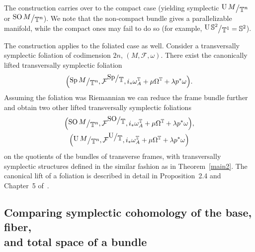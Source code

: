 \documentclass[pdftex]{sigma}
\numberwithin{equation}{section}
\newcommand{\bigslant}[2]{{\raisebox{.2em}{$#1$}\big/\raisebox{-.2em}{$#2$}}}
\begin{document}
\begin{Remark}\label{main3}
The construction carries over to the compact case (yielding symplectic $\bigslant{\operatorname{U} M}{\mathbb{T}^n}$ or $\bigslant{\operatorname{SO} M}{\mathbb{T}^n}$). We note that the non-compact bundle gives a parallelizable manifold, while the compact ones may fail to do so (for example, $\bigslant{\operatorname{U} \mathbb{S}^2}{\mathbb{T}^1}=\mathbb{S}^2$).
\end{Remark}
\begin{Remark} \label{sedno} The construction applies to the foliated case as well. Consider a transversally symplectic foliation of codimension $2n$, $(M,\mathcal{F},\omega)$. There exist the canonically lifted transversally symplectic foliation
\begin{gather*}
\Big(\bigslant{\operatorname{Sp} M}{\mathbb{T}^n},\mathcal{F}^{\bigslant{{\rm Sp}}{\mathbb{T}}},i_*\omega^{\mathbb{T}}_A + \mu\Omega^{\mathbb{T}} + \lambda p^*\omega\Big).
\end{gather*}
Assuming the foliation was Riemannian we can reduce the frame bundle further and obtain two other lifted transversally symplectic foliations
\begin{gather*}
\Big(\bigslant{\operatorname{SO} M}{\mathbb{T}^n},\mathcal{F}^{\bigslant{{\rm SO}}{\mathbb{T}}},i_*\omega^{\mathbb{T}}_A + \mu\Omega^{\mathbb{T}} + \lambda p^*\omega\Big),\\
\Big(\bigslant{\operatorname{U} M}{\mathbb{T}^n},\mathcal{F}^{\bigslant{{\rm U}}{\mathbb{T}}},i_*\omega^{\mathbb{T}}_A + \mu\Omega^{\mathbb{T}} + \lambda p^*\omega\Big)
\end{gather*}
on the quotients of the bundles of transverse frames, with transversally symplectic structures defined in the similar fashion as in Theorem~\ref{main2}. The canonical lift of a foliation is described in detail in Proposition~2.4 and Chapter~5 of~\cite{molino}.
\end{Remark}

\subsection[Comparing symplectic cohomology of the base, fiber, and total space of a bundle]{Comparing symplectic cohomology of the base, fiber,\\ and total space of a bundle}
\end{document}
